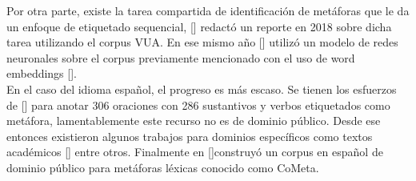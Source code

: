 Por otra parte, existe la tarea compartida de identificación de metáforas que le da un enfoque de etiquetado sequencial, [\cite{LeongEtAl}] redactó un reporte en 2018 sobre dicha tarea utilizando el corpus VUA. En ese mismo año [\cite{Opolka}] utilizó un modelo de redes neuronales sobre el corpus previamente mencionado con el uso de word embeddings [\cite{Mikolov}].\\
En el caso del idioma español, el progreso es más escaso. Se tienen los esfuerzos de [\cite{Santiago}] para anotar 306 oraciones con 286 sustantivos y verbos etiquetados como metáfora, lamentablemente este recurso no es de dominio público. Desde ese entonces existieron algunos trabajos para dominios específicos como textos académicos [\cite{Ureña}] entre otros. Finalmente en [\cite{Sánchez}]construyó un corpus en español de dominio público para metáforas léxicas conocido como CoMeta.





